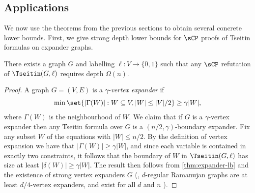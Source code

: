 \documentclass{toc}
\begin{document}
\subsection{Applications}
We now use the theorems from the previous sections to obtain several concrete lower bounds.
First, we give strong depth lower bounds for $\sCP$ proofs of Tseitin formulas on expander graphs. 
\begin{theorem}\label{cor:TseitinLowerBound}
	There exists a graph $G$ and labelling $\ell:V \rightarrow \{0,1\}$ such that any $\sCP$ refutation of $\Tseitin(G,\ell)$ requires depth $\Omega(n)$. 
\end{theorem}
\begin{proof}
	A graph $G=(V,E)$ is a $\gamma$-\emph{vertex expander} if 
	\[\min \set{|\Gamma(W)| : W \subseteq V, |W| \leq |V|/2} \geq \gamma|W|,\]
	where $\Gamma(W)$ is the neighbourhood of $W$.
	We claim that if $G$ is a $\gamma$-vertex expander then any Tseitin formula over $G$ is a $(n/2, \gamma)$-boundary expander.
	Fix any subset $W$ of the equations with $|W| \leq n/2$. 
	By the definition of vertex expansion we have that $|\Gamma(W)| \geq \gamma|W|$, and since each variable is contained in exactly two constraints, it follows that the boundary of $W$ in $\Tseitin(G,\ell)$ has size at least $|\delta(W)| \geq \gamma|W|$.
	The result then follows from \autoref{thm:expander-lb} and the existence of strong vertex expanders $G$ (\eg, $d$-regular Ramanujan graphs are at least $d/4$-vertex expanders, and exist for all $d$ and $n$ \cite{MarcusSS18}).
\end{proof}
\end{document}

